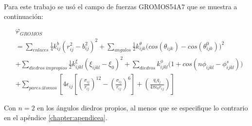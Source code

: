 Para este trabajo se usó el campo de fuerzas GROMOS54A7 que se muestra a continuación:

\begin{equation}
\begin{split}
    &\varphi_{GROMOS}\\ & = \sum_{enlaces}\frac{1}{4}k_{ij}^{b}(r_{ij}^2 - b^{2}_{ij})^2 + \sum_{angulos} \frac{1}{2}k^{\theta}_{ijk}\Big(cos(\theta_{ijk}) - cos(\theta^{0}_{ijk})\Big)^2\\ 
    &+ \sum_{diedros\ impropios}\frac{1}{2}k^{\xi}_{ijkl}(\xi_{ijkl} - \xi_{0})^2 + \sum_{diedros}k^{\phi}_{ijkl}\Big(1 + cos(n\phi_{ijkl} - \phi^{s}_{ijkl}) \Big)\\ 
    &+ \sum_{pares\ átomos}\left[4\epsilon_{ij} \left[\left(\frac{\sigma_{ij}}{r_{ij}} \right)^{12} - \left(\frac{\sigma_{ij}}{r_{ij}}\right)^6 \right] + \left(\frac{q_i q_j}{4\pi \epsilon_{0} r_{ij}}\right)\right]
    \end{split}
\end{equation}

Con $n=2$ en los ángulos diedros propios, al menos que se especifique lo contrario en el apéndice \ref{chapter:apendicea}.\\



